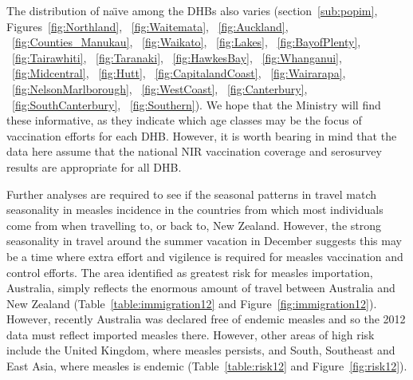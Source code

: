 \documentclass{article}
\begin{document}
The distribution of na\"{\i}ve among the DHBs also varies (section~\autoref{sub:popim}, Figures~\autoref{fig:Northland}, ~\autoref{fig:Waitemata}, ~\autoref{fig:Auckland}, ~\autoref{fig:Counties_Manukau}, ~\autoref{fig:Waikato}, ~\autoref{fig:Lakes}, ~\autoref{fig:BayofPlenty}, ~\autoref{fig:Tairawhiti}, ~\autoref{fig:Taranaki}, ~\autoref{fig:HawkesBay}, ~\autoref{fig:Whanganui}, ~\autoref{fig:Midcentral}, ~\autoref{fig:Hutt}, ~\autoref{fig:CapitalandCoast}, ~\autoref{fig:Wairarapa}, ~\autoref{fig:NelsonMarlborough}, ~\autoref{fig:WestCoast}, ~\autoref{fig:Canterbury}, ~\autoref{fig:SouthCanterbury}, ~\autoref{fig:Southern}).  We hope that the Ministry will find these informative, as they indicate which age classes may be the focus of vaccination efforts for each DHB. However, it is worth bearing in mind that the data here assume that the national NIR vaccination coverage and serosurvey results are appropriate for all DHB.

Further analyses are required to see if the seasonal patterns in travel match seasonality in measles incidence in the countries from which most individuals come from when travelling to, or back to, New Zealand. However, the strong seasonality in travel around the summer vacation in December suggests this may be a time where extra effort and vigilence is required for measles vaccination and control efforts. The area identified as greatest risk for measles importation, Australia, simply reflects the enormous amount of travel between Australia and New Zealand (Table~\autoref{table:immigration12} and Figure~\autoref{fig:immigration12}). However, recently Australia was declared free of endemic measles and so the 2012 data must reflect imported measles there. However, other areas of high risk include the United Kingdom, where measles persists, and South, Southeast and East Asia, where measles is endemic (Table~\autoref{table:risk12} and Figure~\autoref{fig:risk12}).
\end{document}
